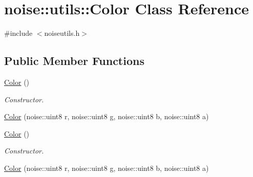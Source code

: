 \hypertarget{classnoise_1_1utils_1_1_color}{\section{noise\+:\+:utils\+:\+:Color Class Reference}
\label{classnoise_1_1utils_1_1_color}
}


{\ttfamily \#include $<$noiseutils.\+h$>$}

\subsection*{Public Member Functions}
\begin{DoxyCompactItemize}
\item 
\hyperlink{classnoise_1_1utils_1_1_color_ac05dc5903b71b525e3b31bcaa53edfd4}{Color} ()
\begin{DoxyCompactList}\small\item\em Constructor. \end{DoxyCompactList}\item 
\hyperlink{classnoise_1_1utils_1_1_color_a3ac5a090df19d7b1a523bc7c231f9112}{Color} (noise\+::uint8 r, noise\+::uint8 \hyperlink{_examples_2_planet_2_app_8cpp_a8cf17d727651616de6f2b79ef32170cd}{g}, noise\+::uint8 b, noise\+::uint8 a)
\item 
\hyperlink{classnoise_1_1utils_1_1_color_ac05dc5903b71b525e3b31bcaa53edfd4}{Color} ()
\begin{DoxyCompactList}\small\item\em Constructor. \end{DoxyCompactList}\item 
\hyperlink{classnoise_1_1utils_1_1_color_a3ac5a090df19d7b1a523bc7c231f9112}{Color} (noise\+::uint8 r, noise\+::uint8 \hyperlink{_examples_2_planet_2_app_8cpp_a8cf17d727651616de6f2b79ef32170cd}{g}, noise\+::uint8 b, noise\+::uint8 a)
\end{DoxyCompactItemize}
